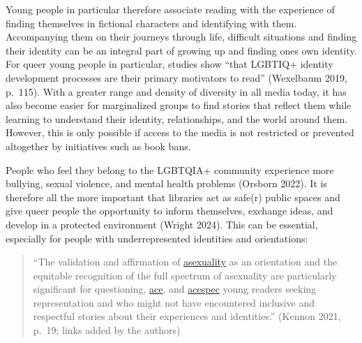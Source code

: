 \documentclass[a4paper,
fontsize=11pt,
oneside,
numbers=noperiodatend,
parskip=half-,
bibliography=totoc,
final
]{scrartcl}
\begin{document}
Young people in particular therefore associate reading with the
experience of finding themselves in fictional characters and identifying
with them. Accompanying them on their journeys through life, difficult
situations and finding their identity can be an integral part of growing
up and finding one\textquotesingle s own identity. For queer young
people in particular, studies show \enquote{that LGBTIQ+ identity development
processes are their primary motivators to read} (Wexelbaum 2019,
p.~115). With a greater range and density of diversity in all media
today, it has also become easier for marginalized groups to find stories
that reflect them while learning to understand their identity,
relationships, and the world around them. However, this is only possible
if access to the media is not restricted or prevented altogether by
initiatives such as book bans.

People who feel they belong to the LGBTQIA+ community experience more
bullying, sexual violence, and mental health problems (Orsborn 2022). It
is therefore all the more important that libraries act as safe(r) public
spaces and give queer people the opportunity to inform themselves,
exchange ideas, and develop in a protected environment (Wright 2024).
This can be essential, especially for people with underrepresented
identities and orientations:

\begin{quote}
\enquote{The validation and affirmation of
\href{https://lgbtqia.fandom.com/wiki/Asexual}{asexuality} as an
orientation and the equitable recognition of the full spectrum of
asexuality are particularly significant for questioning,
\href{https://lgbtqia.fandom.com/wiki/Asexual}{ace}, and
\href{https://lgbtqia.fandom.com/wiki/Asexual_spectrum}{acespec} young
readers seeking representation and who might not have encountered
inclusive and respectful stories about their experiences and
identities.} (Kennon 2021, p.~19; links added by the authors)
\end{quote}
\end{document}
